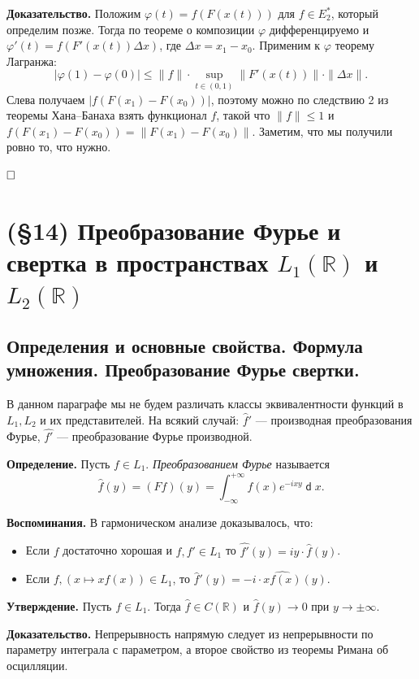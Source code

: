 \documentclass[12pt, a4paper]{article}
\DeclareMathOperator{\dif}{\mathsf{d}}
\newcommand{\QED}{$\hfill\square$}
\renewcommand{\le}{\leqslant}  %
\renewcommand{\phi}{\varphi}   %
\begin{document}
\textbf{Доказательство.} Положим $\phi(t) = f(F(x(t)))$ для $f \in E_2^*$, который определим позже. Тогда по теореме о композиции $\phi$ дифференцируемо и $\phi'(t) = f(F'(x(t)) \Delta x)$, где $\Delta x = x_1 - x_0$. Применим к $\phi$ теорему Лагранжа:
\[
    |\phi(1) - \phi(0)| \le \|f\| \cdot \sup_{t \in (0, 1)} \|F'(x(t))\| \cdot \|\Delta x\|.
\]
Слева получаем $|f(F(x_1) - F(x_0))|$, поэтому можно по следствию 2 из теоремы Хана--Банаха взять функционал $f$, такой что $\|f\| \le 1$ и $f(F(x_1) - F(x_0)) = \|F(x_1) - F(x_0)\|$.
Заметим, что мы получили ровно то, что нужно.

\QED



\section{(§14) Преобразование Фурье и свертка в пространствах \texorpdfstring{$L_1(\mathbb{R})$ и $L_2(\mathbb{R})$}{L1(R) и L2(R)}}

\subsection{Определения и основные свойства. Формула умножения. Преобразование Фурье свертки.}

В данном параграфе мы не будем различать классы эквивалентности функций в $L_1, L_2$ и их представителей.
На всякий случай: $\hat f'$ --- производная преобразования Фурье, $\widehat{f'}$ --- преобразование Фурье производной.

\textbf{Определение.} Пусть $f \in L_1$.
\textit{Преобразованием Фурье} называется 
\[
    \hat f(y) = (Ff)(y) = \int_{-\infty}^{+\infty} f(x) e^{-ixy} \dif x.
\]

\textbf{Воспоминания.} В гармоническом анализе доказывалось, что:
\begin{itemize}
    \item Если $f$ достаточно хорошая и $f, f' \in L_1$ то $\widehat{f'}(y) = iy \cdot \hat f(y)$.
    \item Если $f, (x \mapsto xf(x)) \in L_1$, то $\hat f'(y) = -i \cdot \widehat{x f(x)}(y)$.
\end{itemize}

\textbf{Утверждение.}
Пусть $f \in L_1$.
Тогда $\hat f \in C(\mathbb R)$ и $\hat f(y) \to 0$ при $y \to \pm \infty$.

\textbf{Доказательство.} Непрерывность напрямую следует из непрерывности по параметру интеграла с параметром, а второе свойство из теоремы Римана об осцилляции.
\end{document}
